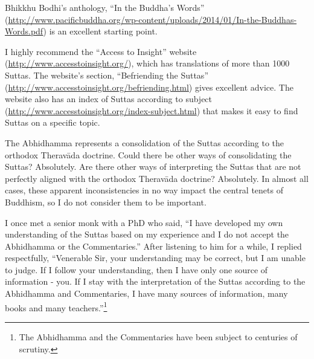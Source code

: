 
Bhikkhu Bodhi’s anthology, “In the Buddha’s Words” (\url{http://www.pacificbuddha.org/wp-content/uploads/2014/01/In-the-Buddhas-Words.pdf}) is an excellent starting point. 

I highly recommend the “Access to Insight” website (\url{http://www.accesstoinsight.org/}), which has translations of more than 1000 Suttas. The website’s section, “Befriending the Suttas” (\url{http://www.accesstoinsight.org/befriending.html}) gives excellent advice. The website also has an index of Suttas according to subject (\url{http://www.accesstoinsight.org/index-subject.html}) that makes it easy to find Suttas on a specific topic.


The Abhidhamma represents a consolidation of the Suttas according to the orthodox Theravāda doctrine. Could there be other ways of consolidating the Suttas? Absolutely. Are there other ways of interpreting the Suttas that are not perfectly aligned with the orthodox Theravāda doctrine? Absolutely. In almost all cases, these apparent inconsistencies in no way impact the central tenets of Buddhism, so I do not consider them to be important.

I once met a senior monk with a PhD who said, “I have developed my own understanding of the Suttas based on my experience and I do not accept the Abhidhamma or the Commentaries.” After listening to him for a while, I replied respectfully, “Venerable Sir, your understanding may be correct, but I am unable to judge. If I follow your understanding, then I have only one source of information - you. If I stay with the interpretation of the Suttas according to the Abhidhamma and Commentaries, I have many sources of information, many books and many teachers.”\footnote{The Abhidhamma and the Commentaries have been subject to centuries of scrutiny.}


